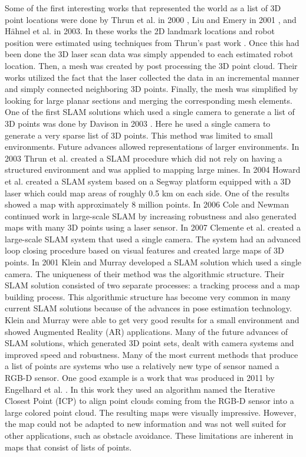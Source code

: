 Some of the first interesting works that represented the world as a list of 3D
point locations were done by Thrun et al. in 2000 \cite{Thrun2000}, Liu and
Emery in 2001 \cite{Liu2001}, and H\"{a}hnel et al. in 2003. In these works the
2D landmark locations and robot position were estimated using techniques from
Thrun's past work \cite{Thrun1998}. Once this had been done the 3D laser scan
data was simply appended to each estimated robot location. Then, a mesh was
created by post processing the 3D point cloud. Their works utilized the fact that the
laser collected the data in an incremental manner and simply connected
neighboring 3D points. Finally, the mesh was simplified by looking for large
planar sections and merging the corresponding mesh elements. One of the first
SLAM solutions which used a single camera to generate a list of 3D points was
done by Davison in 2003 \cite{Davison2003}. Here he used a single camera to
generate a very sparse list of 3D points. This method was limited to small
environments. Future advances allowed representations of larger environments. In
2003 Thrun et al. \cite{Thrun2003} created a SLAM procedure which did not rely
on having a structured environment and was applied to mapping large mines. In
2004 Howard et al. \cite{Howard2004} created a SLAM system based on a Segway
platform equipped with a 3D laser which could map areas of roughly 0.5 km
on each side. One of the results showed a map with approximately 8 million
points. In 2006 Cole and Newman \cite{Cole2006} continued work in large-scale
SLAM by increasing robustness and also generated maps with many 3D points using
a laser sensor. In 2007 Clemente et al. created a large-scale SLAM system that
used a single camera. The system had an advanced loop closing procedure based on
visual features and created large maps of 3D points. In 2001 Klein and Murray
\cite{Klein2007} developed a SLAM solution which used a single camera. The
uniqueness of their method was the algorithmic structure. Their SLAM solution
consisted of two separate processes: a tracking process and a map building
process. This algorithmic structure has become very common in many current SLAM
solutions because of the advances in pose estimation technology. Klein and
Murray were able to get very good results for a small environment and showed
Augmented Reality (AR) applications. Many of the future advances of SLAM
solutions, which generated 3D point sets, dealt with camera systems
\cite{Paz2008,Konolige2008,Strasdat2010} and improved speed and robustness.
Many of the most current methods that produce a list of points are systems who
use a relatively new type of sensor named a RGB-D sensor. One good example is a
work that was produced in 2011 by Engelhard et al. \cite{Engelhard2011}. In this
work they used an algorithm named the Iterative Closest Point (ICP)
\cite{Rusinkiewicz} to align point clouds coming from the RGB-D sensor into
a large colored point cloud. The resulting maps were visually impressive.
However, the map could not be adapted to new information and was not well suited
for other applications, such as obstacle avoidance. These limitations are
inherent in maps that consist of lists of points.

